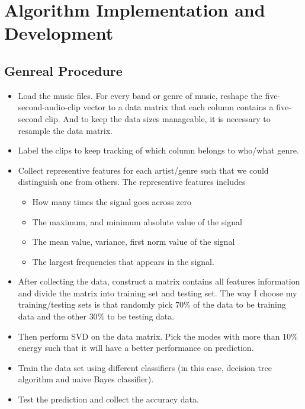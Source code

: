 \documentclass[twoside,twocolumn]{article}
\begin{document}
    \section{Algorithm Implementation and Development}
    \subsection{Genreal Procedure}
    \begin{itemize}
        \item Load the music files. For every band or genre of music, reshape the five-second-audio-clip vector to a data
        matrix that each column contains a five-second clip. And to keep the data sizes manageable, it is necessary to resample
        the data matrix.
        \item Label the clips to keep tracking of which column belongs to who/what genre.
        \item Collect representive features for each artist/genre such that we could distinguish one from others. The representive
        features includes
        \begin{itemize}
            \item How many times the signal goes across zero
            \item The maximum, and minimum absolute value of the signal
            \item The mean value, variance, first norm value of the signal
            \item The largest frequencies that appears in the signal.
        \end{itemize}
        \item After collecting the data, construct a matrix contains all features information and divide the matrix into training 
        set and testing set. The way I choose my training/testing sets is that randomly pick $70\%$ of the data to be training data
        and the other $30\%$ to be testing data.
        \item Then perform SVD on the data matrix. Pick the modes with more than $10\%$ energy such that it will have a better 
        performance on prediction.
        \item Train the data set using different classifiers (in this case, decision tree algorithm and naive Bayes classifier).
        \item Test the prediction and collect the accuracy data.
    \end{itemize}
\end{document}
